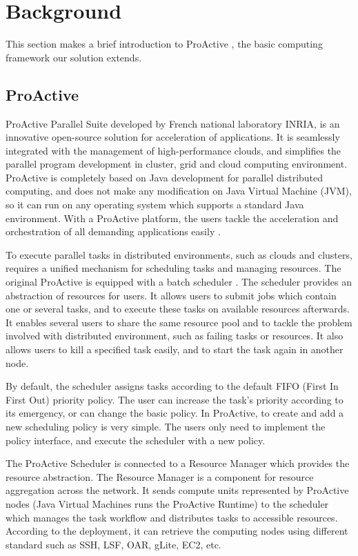 \section{Background}

This section makes a brief introduction to ProActive \cite{huet04high}, the basic
computing framework our solution extends.

\subsection{ProActive}

ProActive Parallel Suite developed by French national laboratory INRIA, is an innovative
open-source solution for acceleration of applications. It is seamlessly integrated with
the management of high-performance clouds, and simplifies the parallel program development
in cluster, grid and cloud computing environment. ProActive is completely based on Java
development for parallel distributed computing, and does not make any modification on Java
Virtual Machine (JVM), so it can run on any operating system which supports a standard
Java environment. With a ProActive platform, the users tackle the acceleration and
orchestration of all demanding applications easily \cite{ProActive}.

To execute parallel tasks in distributed environments, such as clouds and clusters,
requires a unified mechanism for scheduling tasks and managing resources. The original
ProActive is equipped with a batch scheduler \cite{ProActiveScheduling}. The scheduler
provides an abstraction of resources for users. It allows users to submit jobs which contain
one or several tasks, and to execute these tasks on available resources afterwards. It enables
several users to share the same resource pool and to tackle the problem involved with
distributed environment, such as failing tasks or resources. It also allows users to kill a
specified task easily, and to start the task again in another node.

By default, the scheduler assigns tasks according to the default FIFO (First In First Out)
priority policy. The user can increase the task's priority according to its emergency,
or can change the basic policy. In ProActive, to create and add a new scheduling
policy is very simple. The users only need to implement the policy interface, and execute
the scheduler with a new policy.

The ProActive Scheduler \cite{pascheduling} is connected to a Resource Manager \cite{parm}
which provides the resource abstraction. The Resource Manager is a component for resource
aggregation across the network. It sends compute units represented by ProActive nodes
(Java Virtual Machines runs the ProActive Runtime) to the scheduler which manages the
task workflow and distributes tasks to accessible resources. According to the deployment,
it can retrieve the computing nodes using different standard such as SSH, LSF, OAR, gLite,
EC2, etc.

